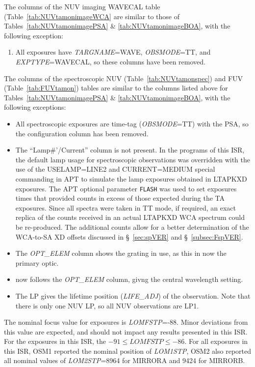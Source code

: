 The columns of the NUV imaging WAVECAL table (Table~\ref{tab:NUVtamonimageWCA} are similar to those of Tables~\ref{tab:NUVtamonimagePSA} \& \ref{tab:NUVtamonimageBOA}, with the following exception:
\begin{enumerate}
\item All exposures have \textit{TARGNAME}=WAVE, \textit{OBSMODE}=TT, and \textit{EXPTYPE}=WAVECAL, so these columns have been removed.
\end{enumerate}

The columns of the spectroscopic NUV (Table~\ref{tab:NUVtamonspec}) and FUV (Table~\ref{tab:FUVtamon}) tables are similar to the columns listed above for Tables~\ref{tab:NUVtamonimagePSA} \& \ref{tab:NUVtamonimageBOA}, with the following exceptions:
\begin{itemize}
\item All spectroscopic exposures are time-tag (\textit{OBSMODE}=TT) with the PSA, so the configuration column has been removed.
\item The ``Lamp\#'/Current'' column is not present. In the programs of this ISR, the default \plampone lamp usage for spectroscopic observations was overridden with the use of the \textsc{USELAMP=LINE2} and \textsc{CURRENT=MEDIUM} special commanding
in APT to simulate the lamp exposures obtained in \textsc{LTAPKXD} exposures.
The APT optional parameter \texttt{FLASH} was used to set \plamptwo exposures times that
provided counts in excess of those expected during the TA exposures.  Since all spectra were taken in TT mode,
if required, an exact replica of the counts received in an actual \textsc{LTAPKXD} WCA spectrum could be re-produced.
The additional counts allow for a better determination of the WCA-to-SA XD offsets discussed in \S~\ref{sec:spVER} and \S~\ref{subsec:FspVER}.
\item The \textit{OPT\_ELEM} column shows the grating in use, as this in now the primary optic.
\item \cenwave{} now follows the \textit{OPT\_ELEM} column, givng the central wavelength setting.
\item The LP gives the lifetime position (\textit{LIFE\_ADJ}) of the observation. Note that there is only one NUV LP, so all NUV observations are LP1.
\end{itemize}
\normalsize

The nominal focus value for  exposures is \textit{LOMFSTP}=-88. Minor deviations from this value are expected, and should not impact any results presented in this ISR.
For the exposures in this ISR, the $-91\leq \textit{LOMFSTP} \leq-86 $. For all exposures in this ISR, OSM1 reported the nominal  position of \textit{LOM1STP}, OSM2
also reported all nominal values of \textit{LOM2STP}=8964 for MIRRORA and  9424 for MIRRORB.




